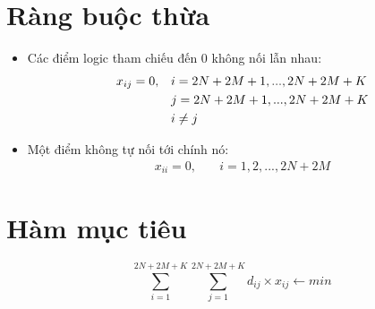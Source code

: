 \documentclass[3p,12pt]{article}
\begin{document}
	\section{Ràng buộc thừa}
	\begin{itemize}
		\item Các điểm logic tham chiếu đến $0$ không nối lẫn nhau:
		\begin{align}
			x_{ij}=0,\quad & i=2N+2M+1,...,2N+2M+K \\
							& j=2N+2M+1,...,2N+2M+K \notag \\
							& i\ne j \notag
		\end{align}
		\item Một điểm không tự nối tới chính nó:
		\begin{align}
			x_{ii}=0,\quad & i=1,2,...,2N+2M
		\end{align}
	\end{itemize}

	\section{Hàm mục tiêu}
	\begin{equation}
		\sum_{i=1}^{2N+2M+K} \sum_{j=1}^{2N+2M+K} d_{ij}\times x_{ij} \leftarrow min
	\end{equation}
\end{document}
